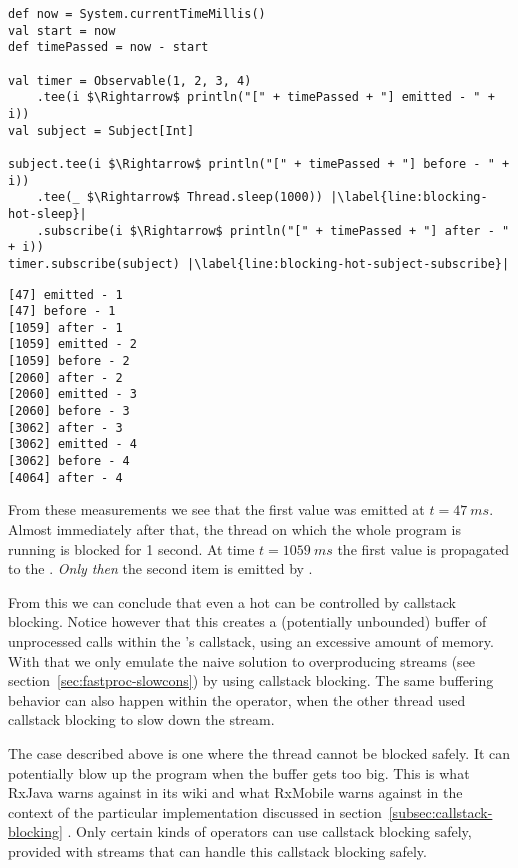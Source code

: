\begin{minipage}{\linewidth}
\begin{lstlisting}[style=ScalaStyle, caption={Applying callstack blocking on a hot \obs}, label={lst:blocking-hot-obs}]
def now = System.currentTimeMillis()
val start = now
def timePassed = now - start

val timer = Observable(1, 2, 3, 4)
    .tee(i $\Rightarrow$ println("[" + timePassed + "] emitted - " + i))
val subject = Subject[Int]

subject.tee(i $\Rightarrow$ println("[" + timePassed + "] before - " + i))
    .tee(_ $\Rightarrow$ Thread.sleep(1000)) |\label{line:blocking-hot-sleep}|
    .subscribe(i $\Rightarrow$ println("[" + timePassed + "] after - " + i))
timer.subscribe(subject) |\label{line:blocking-hot-subject-subscribe}|
\end{lstlisting}
\end{minipage}

\begin{minipage}{\linewidth}
\begin{lstlisting}[style=ScalaStyle, caption={Console output from \autoref{lst:blocking-hot-obs}}, label={lst:console-output-blocking-hot}]
[47] emitted - 1
[47] before - 1
[1059] after - 1
[1059] emitted - 2
[1059] before - 2
[2060] after - 2
[2060] emitted - 3
[2060] before - 3
[3062] after - 3
[3062] emitted - 4
[3062] before - 4
[4064] after - 4
\end{lstlisting}
\end{minipage}

From these measurements we see that the first value was emitted at $t=47\ ms$. Almost immediately after that, the thread on which the whole program is running is blocked for 1 second. At time $t=1059\ ms$ the first value is propagated to the . \emph{Only then} the second item is emitted by .

From this we can conclude that even a hot \obs can be controlled by callstack blocking. Notice however that this creates a (potentially unbounded) buffer of unprocessed  calls within the 's callstack, using an excessive amount of memory. With that we only emulate the naive solution to overproducing streams (see section~\ref{sec:fastproc-slowcons}) by using callstack blocking. The same buffering behavior can also happen within the  operator, when the other thread used callstack blocking to slow down the stream.

The case described above is one where the thread cannot be blocked safely. It can potentially blow up the program when the buffer gets too big. This is what RxJava warns against in its wiki \cite{RxJava-Wiki-Callstack-Blocking} and what RxMobile warns against in the context of the particular  implementation discussed in section~\ref{subsec:callstack-blocking} \cite{RxMobile}. Only certain kinds of operators can use callstack blocking safely, provided with streams that can handle this callstack blocking safely.

